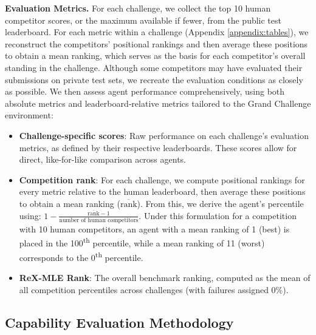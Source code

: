 \documentclass{midl} %
\begin{document}
\vspace{3pt} \noindent \textbf{Evaluation Metrics.} For each challenge, we collect the top 10 human competitor scores, or the maximum available if fewer, from the public test leaderboard. For each metric within a challenge (Appendix \ref{appendix:tables}), we reconstruct the competitors’ positional rankings and then average these positions to obtain a mean ranking, which serves as the basis for each competitor’s overall standing in the challenge. Although some competitors may have evaluated their submissions on private test sets, we recreate the evaluation conditions as closely as possible. We then assess agent performance comprehensively, using both absolute metrics and leaderboard‑relative metrics tailored to the Grand Challenge environment:

\begin{itemize}[leftmargin=*, nosep]
\item \textbf{Challenge-specific scores}: Raw performance on each challenge’s evaluation metrics, as defined by their respective leaderboards. These scores allow for direct, like-for-like comparison across agents.

\item \textbf{Competition rank}: For each challenge, we compute positional rankings for every metric relative to the human leaderboard, then average these positions to obtain a mean ranking ($\overline{\text{rank}}$). From this, we derive the agent’s percentile using: $1 - \frac{\overline{\text{rank}} - 1}{\text{number of human competitors}}$. Under this formulation for a competition with 10 human competitors, an agent with a mean ranking of 1 (best) is placed in the 100\textsuperscript{th} percentile, while a mean ranking of 11 (worst) corresponds to the 0\textsuperscript{th} percentile.

\item \textbf{ReX-MLE Rank}: The overall benchmark ranking, computed as the mean of all competition percentiles across challenges (with failures assigned 0\%).
\end{itemize}

\subsection{Capability Evaluation Methodology}
\end{document}

